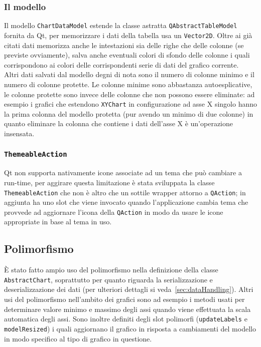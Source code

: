 \subsubsection{Il modello}
Il modello \texttt{ChartDataModel} estende la classe astratta \texttt{QAbstractTableModel} fornita da Qt, per
memorizzare i dati della tabella usa un \texttt{Vector2D}.
Oltre ai già citati dati memorizza anche le intestazioni sia delle righe che delle colonne (se previste ovviamente),
salva anche eventuali colori di sfondo delle colonne i quali corrispondono ai colori delle corrispondenti serie di dati
del grafico corrente.\\
Altri dati salvati dal modello degni di nota sono il numero di colonne minimo e il numero di colonne protette.
Le colonne minime sono abbastanza autoesplicative, le colonne protette sono invece delle colonne che non possono essere
eliminate: ad esempio i grafici che estendono \texttt{XYChart} in configurazione ad asse X singolo hanno la prima
colonna del modello protetta (pur avendo un minimo di due colonne) in quanto eliminare la colonna che contiene i dati
dell'asse X è un'operazione insensata.\\


\subsubsection{\texttt{ThemeableAction}}
Qt non supporta nativamente icone associate ad un tema che può cambiare a run-time, per aggirare questa limitazione è
stata sviluppata la classe \texttt{ThemeableAction} che non è altro che un sottile wrapper attorno a \texttt{QAction};
in aggiunta ha uno slot che viene invocato quando l'applicazione cambia tema che provvede ad aggiornare l'icona della
\texttt{QAction} in modo da usare le icone appropriate in base al tema in uso.

\subsection{Polimorfismo}
È stato fatto ampio uso del polimorfismo nella definizione della classe \texttt{AbstractChart}, soprattutto per
quanto riguarda la serializzazione e deserializzazione dei dati (per ulteriori dettagli si veda~\ref{sec:dataHandling}).
Altri usi del polimorfismo nell'ambito dei grafici sono ad esempio i metodi usati per determinare valore minimo e
massimo degli assi quando viene effettuata la scala automatica degli assi.
Sono inoltre definiti degli slot polimorfi (\texttt{updateLabels} e \texttt{modelResized}) i quali aggiornano il
grafico in risposta a cambiamenti del modello in modo specifico al tipo di grafico in questione.

